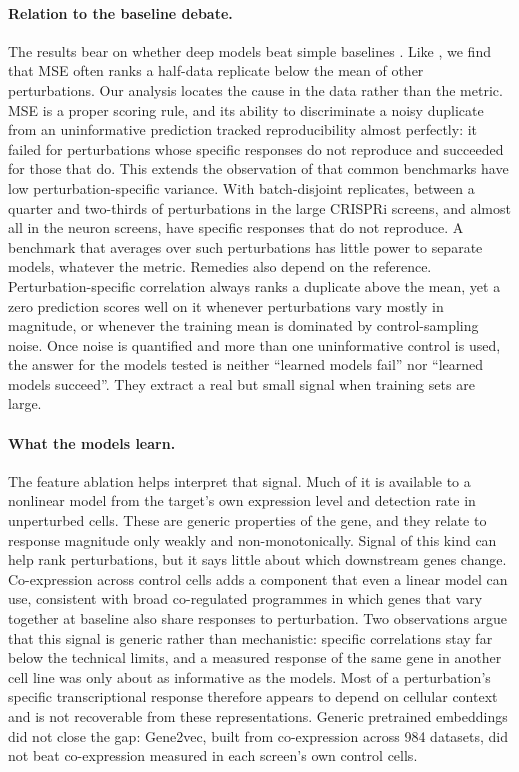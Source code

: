 \paragraph{Relation to the baseline debate.} The results bear on whether deep models beat simple baselines \citep{ahlmanneltze2025,csendes2025,vinastorne2025,miller2026}. Like \citet{miller2026}, we find that MSE often ranks a half-data replicate below the mean of other perturbations. Our analysis locates the cause in the data rather than the metric. MSE is a proper scoring rule, and its ability to discriminate a noisy duplicate from an uninformative prediction tracked reproducibility almost perfectly: it failed for perturbations whose specific responses do not reproduce and succeeded for those that do. This extends the observation of \citet{csendes2025} that common benchmarks have low perturbation-specific variance. With batch-disjoint replicates, between a quarter and two-thirds of perturbations in the large CRISPRi screens, and almost all in the neuron screens, have specific responses that do not reproduce. A benchmark that averages over such perturbations has little power to separate models, whatever the metric. Remedies also depend on the reference. Perturbation-specific correlation always ranks a duplicate above the mean, yet a zero prediction scores well on it whenever perturbations vary mostly in magnitude, or whenever the training mean is dominated by control-sampling noise. Once noise is quantified and more than one uninformative control is used, the answer for the models tested is neither ``learned models fail'' nor ``learned models succeed''. They extract a real but small signal when training sets are large.

\paragraph{What the models learn.} The feature ablation helps interpret that signal. Much of it is available to a nonlinear model from the target's own expression level and detection rate in unperturbed cells. These are generic properties of the gene, and they relate to response magnitude only weakly and non-monotonically. Signal of this kind can help rank perturbations, but it says little about which downstream genes change. Co-expression across control cells adds a component that even a linear model can use, consistent with broad co-regulated programmes in which genes that vary together at baseline also share responses to perturbation. Two observations argue that this signal is generic rather than mechanistic: specific correlations stay far below the technical limits, and a measured response of the same gene in another cell line was only about as informative as the models. Most of a perturbation's specific transcriptional response therefore appears to depend on cellular context and is not recoverable from these representations. Generic pretrained embeddings did not close the gap: Gene2vec, built from co-expression across 984 datasets, did not beat co-expression measured in each screen's own control cells.

